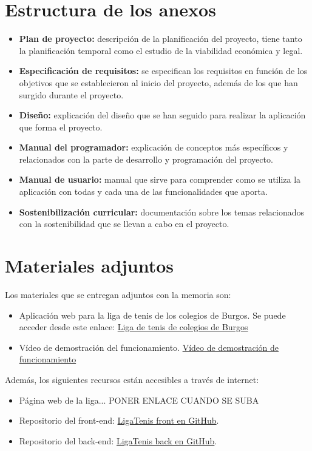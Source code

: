\section{Estructura de los anexos}\label{estructura-anexos}

\begin{itemize}
\tightlist
\item
  \textbf{Plan de proyecto:} descripción de la planificación del proyecto, tiene tanto la planificación temporal como el estudio de la viabilidad económica y legal.
\item
  \textbf{Especificación de requisitos:} se especifican los requisitos en función de los objetivos que se establecieron al inicio del proyecto, además de los que han surgido durante el proyecto.
\item
  \textbf{Diseño:} explicación del diseño que se han seguido para realizar la aplicación que forma el proyecto.
\item
  \textbf{Manual del programador:} explicación de conceptos más específicos y relacionados con la parte de desarrollo y programación del proyecto.
\item
  \textbf{Manual de usuario:} manual que sirve para comprender como se utiliza la aplicación con todas y cada una de las funcionalidades que aporta.
\item
  \textbf{Sostenibilización curricular:} documentación sobre los temas relacionados con la sostenibilidad que se llevan a cabo en el proyecto.
\end{itemize}


\section{Materiales adjuntos}\label{materiales-adjuntos}

Los materiales que se entregan adjuntos con la memoria son: 

\begin{itemize}
\tightlist
\item
	Aplicación web para la liga de tenis de los colegios de Burgos.
    Se puede acceder desde este enlace: \href{http://13.61.14.244/}{Liga de tenis de colegios de Burgos}
\item	
	Vídeo de demostración del funcionamiento. \href{https://youtu.be/CiM1DY7O88A}{Vídeo de demostración de funcionamiento}
\end{itemize}

Además, los siguientes recursos están accesibles a través de internet:

\begin{itemize}
\tightlist
\item
  Página web de la liga... PONER ENLACE CUANDO SE SUBA

\item Repositorio del front-end: 
    \href{https://github.com/Nachoozg/tfg}{LigaTenis front en GitHub}.
    
\item Repositorio del back-end: 
    \href{https://github.com/Nachoozg/tfg-back}{LigaTenis back en GitHub}.

\end{itemize}
